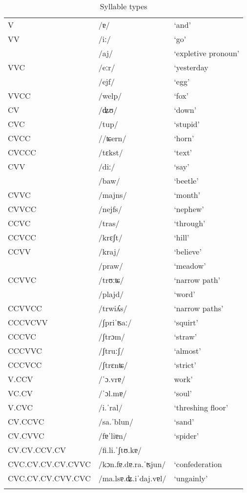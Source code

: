 \begin{table}
	\caption{Syllable types}
	\label{syllt}
	\begin{tabular}{lll}
		\lsptoprule
V &	/ɐ/ &`and'\\
VV & /iː/ & `go'  \\
& /aj/ &`expletive pronoun'\\
VVC & /eːr/ & `yesterday\\
& /ejf/ & `egg'\\
VVCC & /welp/ & `fox'\\
CV & /ʥʊ/ & `down'\\
CVC & /tup/ & `stupid'\\
CVCC & //ʨern/ & `horn'\\
CVCCC & /tɛkst/ & `text'\\
CVV & /diː/ & `say'\\
& /baw/ & `beetle'\\
CVVC& /majns/ & `month'\\
CVVCC & /nejfs/ & `nephew'\\
CCVC & /tras/ & `through'\\
CCVCC & /krɛʃt/ & `hill'\\
CCVV & /kraj/ & `believe'\\
& /praw/ & `meadow'\\
CCVVC & /trʊːʨ/ & `narrow path'\\
& /plajd/ & `word'\\
CCVVCC & /trwiʎs/ & `narrow paths'\\
CCCVCVV & /ʃpriˈʦaː/ & `squirt'\\
CCCVC & /ʃtrɔm/ & `straw'\\
CCCVVC & /ʃtruːʃ/ & `almost'\\
CCCVCC & /ʃtrɛnʨ/ & `strict'\\
V.CCV & /ˈɔ.vrɐ/ & work'\\
VC.CV & /ˈɔl.mɐ/ & `soul'\\
V.CVC & /i.ˈral/ & `threshing floor'\\
CV.CCVC & /sa.ˈblun/ & `sand'\\
CV.CVVC & /fɐˈliɐn/ & `spider'\\
CV.CV.CCV.CV & /fi.li.ˈʃtʊ.kɐ/\\
CVC.CV.CV.CV.CVVC & /kɔn.fɐ.dɐ.ra.ˈʦjun/ & `confederation\\
CVC.CV.CV.CVV.CVC & /ma.lsɐ.ʥ.iˈdaj.vɐl/ & `ungainly'\\
 \lspbottomrule
\end{tabular}
\end{table}


